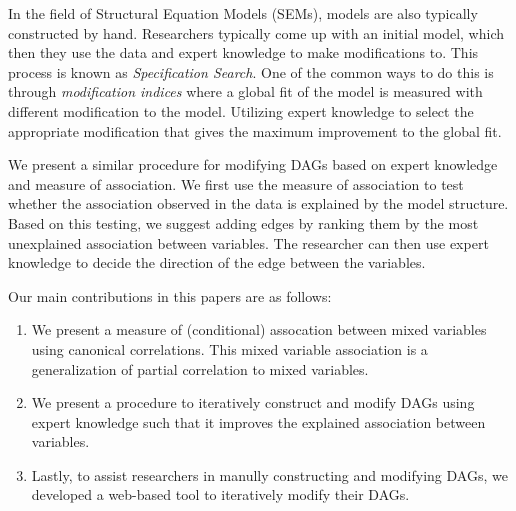 \documentclass{article}
\begin{document}
In the field of Structural Equation Models (SEMs), models are also typically
constructed by hand. Researchers typically come up with an initial model, which
then they use the data and expert knowledge to make modifications to. This
process is known as \emph{Specification Search}. One of the common ways to do
this is through \emph{modification indices} where a global fit of the model is
measured with different modification to the model. Utilizing expert knowledge
to select the appropriate modification that gives the maximum improvement to
the global fit.

We present a similar procedure for modifying DAGs based on expert knowledge and
measure of association. We first use the measure of association to test whether
the association observed in the data is explained by the model structure. Based 
on this testing, we suggest adding edges by ranking them by the most unexplained
association between variables. The researcher can then use expert knowledge to 
decide the direction of the edge between the variables.

Our main contributions in this papers are as follows:
\begin{enumerate}
	\item We present a measure of (conditional) assocation between mixed variables using
		canonical correlations. This mixed variable association is a generalization 
		of partial correlation to mixed variables.
	\item We present a procedure to iteratively construct and modify DAGs using expert 
		knowledge such that it improves the explained association between variables.
	\item Lastly, to assist researchers in manully constructing and modifying DAGs,
		we developed a web-based tool to iteratively modify their DAGs.
\end{enumerate}
\end{document}
